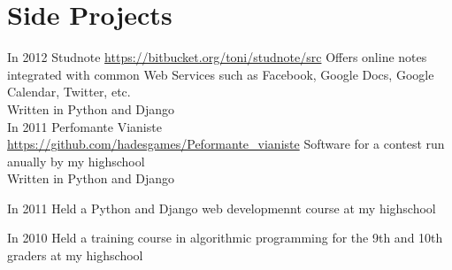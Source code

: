 \documentclass[]{friggeri-cv}
\begin{document}


% 

\pagebreak

\section{Side Projects}

\begin{entrylist}
  \entry
  {In 2012} 
  {}
  {Studnote}
  {\href{http://bitbucket.org/toni/studnote/src}{https://bitbucket.org/toni/studnote/src}}
  {
    Offers online notes integrated with common Web Services such as Facebook, Google Docs, Google Calendar, Twitter, etc. \\
    Written in Python and Django \\ 
  }
  \entry
  {In 2011}
  {}
  {Perfomante Vianiste}
  {
    \href{https://github.com/hadesgames/Performante\_vianiste}{https://github.com/hadesgames/Peformante\_vianiste}
  }
  {
    Software for a contest run anually by my highschool \\
    Written in Python and Django \\
  }

  \entry
  {In 2011}
  {}
  {Held a Python and Django web developmennt course at my highschool}
  {}
  {}

  \entry
  {In 2010}
  {}
  {Held a training course in algorithmic programming for the 9th and 10th graders at my highschool}
  {}
  {}
\end{entrylist}
\end{document}
